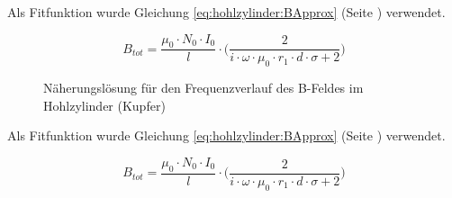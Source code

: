 \clearpage
{\pdfpagewidth
	\textwidth
    \addtolength{\textwidth}{40mm}
	\begin{minipage}[c][][t]{0.77\textwidth}
		\resizebox{\textwidth}{!}{}
		\label{fig:cu:freq:approx}
	\end{minipage}%
	\begin{minipage}[c][][t]{0.23\textwidth}
		

		Als  Fitfunktion  wurde   Gleichung  \ref{eq:hohlzylinder:BApprox}  (Seite
		\pageref{eq:hohlzylinder:BApprox}) verwendet.

		\begin{equation*}
			B_{tot} = \frac{\mu_0 \cdot N_0 \cdot I_0}{l} \cdot \Biggl( \frac{2}{i \cdot \omega \cdot \mu_0 \cdot r_1 \cdot d \cdot \sigma + 2} \Biggr)
		\end{equation*}
	\end{minipage}
\clearpage
}

\begin{figure}[h!]
    \resizebox{\textwidth}{!}{}
    \caption{N\"aherungsl\"osung f\"ur den Frequenzverlauf des B-Feldes im Hohlzylinder (Kupfer)}
    \label{fig:cu:freq:approx}
\end{figure}

\begin{minipage}[t][][t]{0.43\textwidth}
    
\end{minipage}
\begin{minipage}[t][][t]{0.56\textwidth}

    Als  Fitfunktion  wurde   Gleichung  \ref{eq:hohlzylinder:BApprox}  (Seite
    \pageref{eq:hohlzylinder:BApprox}) verwendet.

    \begin{equation*}
        B_{tot} = \frac{\mu_0 \cdot N_0 \cdot I_0}{l} \cdot \Biggl( \frac{2}{i \cdot \omega \cdot \mu_0 \cdot r_1 \cdot d \cdot \sigma + 2} \Biggr)
    \end{equation*}

\end{minipage}

